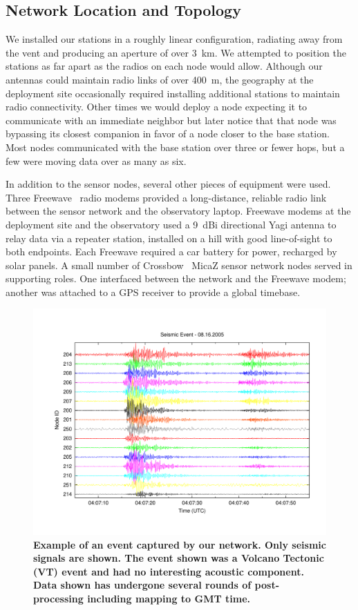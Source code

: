 \subsection{Network Location and Topology}

We installed our stations in a roughly linear configuration, radiating away
from the vent and producing an aperture of over 3~km.  We attempted to
position the stations as far apart as the radios on each node would allow.
Although our antennas could maintain radio links of over 400~m, the geography
at the deployment site occasionally required installing additional stations
to maintain radio connectivity.  Other times we would deploy a node expecting
it to communicate with an immediate neighbor but later notice that that node
was bypassing its closest companion in favor of a node closer to the base
station.  Most nodes communicated with the base station over three or fewer
hops, but a few were moving data over as many as six.

In addition to the sensor nodes, several other pieces of equipment
were used.  Three Freewave~\cite{freewave} radio modems provided a
long-distance, reliable radio link between the sensor network and the
observatory laptop.  Freewave modems at the deployment site and the
observatory used a 9~dBi directional Yagi antenna to relay data via a
repeater station, installed on a hill with good line-of-sight to both
endpoints.  Each Freewave required a car battery for power, recharged
by solar panels.  A small number of Crossbow~\cite{xbow} MicaZ sensor
network nodes served in supporting roles.  One interfaced between the
network and the Freewave modem; another was attached to a GPS receiver
to provide a global timebase.

\begin{figure}[t]
\begin{center}
\includegraphics[width=0.7\hsize]{./figures/TEST}
\end{center}
\caption{\small {\bf {Example of an event captured by our network.  Only
seismic signals are shown.  The event shown was a Volcano Tectonic (VT) event
and had no interesting acoustic component.  Data shown has undergone several
rounds of post-processing including mapping to GMT time.}}}
\label{fig-plot}
\end{figure}

